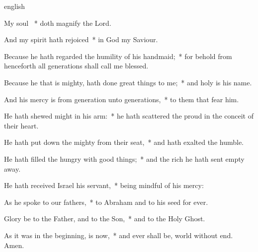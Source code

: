  {english}
{My soul \cc~* doth magnify the Lord.

And my spirit hath rejoiced~* in God my Saviour.

Because he hath regarded the humility of his handmaid;~* for behold from henceforth all generations shall call me blessed.

Because he that is mighty, hath done great things to me;~* and holy is his name.

And his mercy is from generation unto generations,~* to them that fear him.

He hath shewed might in his arm:~* he hath scattered the proud in the conceit of their heart.

He hath put down the mighty from their seat,~* and hath exalted the humble.

He hath filled the hungry with good things;~* and the rich he hath sent empty away.

He hath received Israel his servant,~* being mindful of his mercy:

As he spoke to our fathers,~* to Abraham and to his seed for ever.

Glory be to the Father, and to the Son,~* and to the Holy Ghost.

As it was in the beginning, is now,~* and ever shall be, world without end. Amen.}

